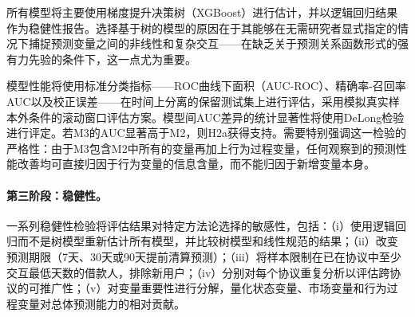 所有模型将主要使用梯度提升决策树（XGBoost）进行估计，并以逻辑回归结果作为稳健性报告。选择基于树的模型的原因在于其能够在无需研究者显式指定的情况下捕捉预测变量之间的非线性和复杂交互——在缺乏关于预测关系函数形式的强有力先验的条件下，这一点尤为重要。

模型性能将使用标准分类指标——ROC曲线下面积（AUC-ROC）、精确率-召回率AUC以及校正误差——在时间上分离的保留测试集上进行评估，采用模拟真实样本外条件的滚动窗口评估方案。模型间AUC差异的统计显著性将使用DeLong检验进行评定。若M3的AUC显著高于M2，则H2a获得支持。需要特别强调这一检验的严格性：由于M3包含M2中所有的变量再加上行为过程变量，任何观察到的预测性能改善均可直接归因于行为变量的信息含量，而不能归因于新增变量本身。

\paragraph{第三阶段：稳健性。} 一系列稳健性检验将评估结果对特定方法论选择的敏感性，包括：（i）使用逻辑回归而不是树模型重新估计所有模型，并比较树模型和线性规范的结果；（ii）改变预测期限（7天、30天或90天提前清算预测）；（iii）将样本限制在已在协议中至少交互最低天数的借款人，排除新用户；（iv）分别对每个协议重复分析以评估跨协议的可推广性；（v）对变量重要性进行分解，量化状态变量、市场变量和行为过程变量对总体预测能力的相对贡献。
